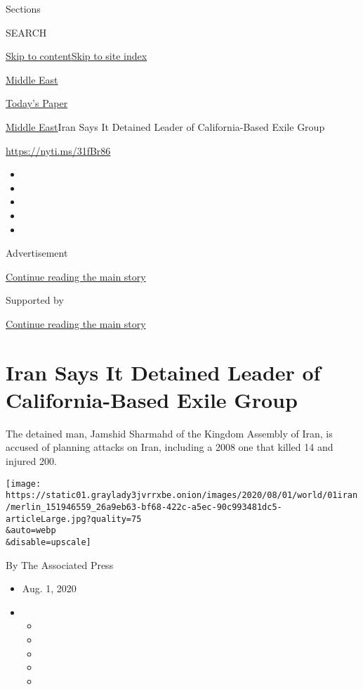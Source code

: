 Sections

SEARCH

\protect\hyperlink{site-content}{Skip to
content}\protect\hyperlink{site-index}{Skip to site index}

\href{https://www.nytimes3xbfgragh.onion/section/world/middleeast}{Middle
East}

\href{https://myaccount.nytimes3xbfgragh.onion/auth/login?response_type=cookie\&client_id=vi}{}

\href{https://www.nytimes3xbfgragh.onion/section/todayspaper}{Today's
Paper}

\href{/section/world/middleeast}{Middle East}\textbar{}Iran Says It
Detained Leader of California-Based Exile Group

\url{https://nyti.ms/31fBr86}

\begin{itemize}
\item
\item
\item
\item
\item
\end{itemize}

Advertisement

\protect\hyperlink{after-top}{Continue reading the main story}

Supported by

\protect\hyperlink{after-sponsor}{Continue reading the main story}

\hypertarget{iran-says-it-detained-leader-of-california-based-exile-group}{%
\section{Iran Says It Detained Leader of California-Based Exile
Group}\label{iran-says-it-detained-leader-of-california-based-exile-group}}

The detained man, Jamshid Sharmahd of the Kingdom Assembly of Iran, is
accused of planning attacks on Iran, including a 2008 one that killed 14
and injured 200.

\texttt{[image: https://static01.graylady3jvrrxbe.onion/images/2020/08/01/world/01iran/merlin\_151946559\_26a9eb63-bf68-422c-a5ec-90c993481dc5-articleLarge.jpg?quality=75\\\&auto=webp\\\&disable=upscale]}

By The Associated Press

\begin{itemize}
\item
  Aug. 1, 2020
\item
  \begin{itemize}
  \item
  \item
  \item
  \item
  \item
  \end{itemize}
\end{itemize}


